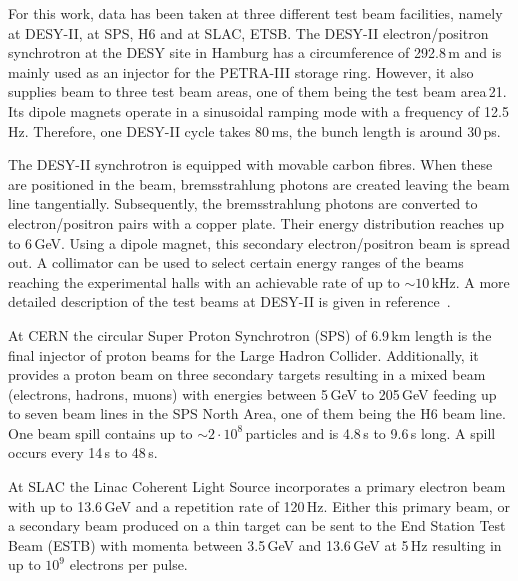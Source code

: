 
For this work, data has been taken at three different test beam facilities, namely at {DESY-II}, at SPS, H6 and at SLAC, ETSB.
The DESY-II electron/positron synchrotron at the DESY site in Hamburg has a circumference of 292.8\,m and is mainly used as an injector for the PETRA-III storage ring. 
However, it also supplies beam to three test beam areas, one  of them being the test beam area\,21.
Its dipole magnets operate in a sinusoidal ramping mode with a frequency of 12.5\,Hz. 
Therefore, one DESY-II cycle takes 80\,ms, the bunch length is around 30\,ps. 

The DESY-II synchrotron is equipped with movable carbon fibres. 
When these are positioned in the beam, bremsstrahlung photons are created leaving the beam line tangentially.
Subsequently, the bremsstrahlung photons are converted to electron/positron pairs with a copper plate. 
Their energy distribution reaches up to 6\,GeV. 
Using a dipole magnet, this secondary electron/positron beam is spread out.
A collimator can be used to select certain energy ranges of the beams reaching the experimental halls with an achievable rate of up to $\sim 10$\,kHz. 
A more detailed description of the test beams at {DESY-II} is given in reference~\cite{EUDET-2007-11}.

At CERN the circular Super Proton Synchrotron (SPS) of 6.9\,km length is the final injector of proton beams for the Large Hadron Collider. 
Additionally, it provides a proton beam on three secondary targets resulting in a mixed beam (electrons, hadrons, muons) with energies between 5\,GeV to 205\,GeV
 feeding up to seven beam lines in the SPS North Area, one of them being the H6 beam line. 
One beam spill contains up to $\sim 2\cdot10^8$\,particles and is 4.8\,s to 9.6\,s long. 
A spill occurs every 14\,s to 48\,s.\,\cite{SPS} 

At SLAC the Linac Coherent Light Source incorporates a primary electron beam with up to 13.6\,GeV and a repetition rate of 120\,Hz.
Either this primary beam, or a secondary beam produced on a thin target can be sent to the End Station Test Beam (ESTB) with momenta between 3.5\,GeV and 13.6\,GeV at 5\,Hz
 resulting in up to $10^{9}$ electrons per pulse.\,\cite{SLAC}

